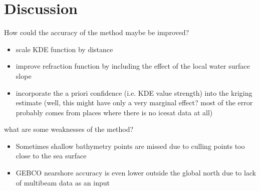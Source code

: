 \chapter{Discussion}

How could the accuracy of the method maybe be improved?
\begin{itemize}
    \item scale KDE function by distance 
    \item improve refraction function by including the effect of the local water surface slope
    \item incorporate the a priori confidence (i.e. KDE value strength) into the kriging estimate (well, this might have only a very marginal effect? most of the error probably comes from places where there is no icesat data at all) 
\end{itemize}

what are some weaknesses of the method?

\begin{itemize}
    \item Sometimes shallow bathymetry points are missed due to culling points too close to the sea surface
    \item GEBCO nearshore accuracy is even lower outside the global north due to lack of multibeam data as an input 
\end{itemize}